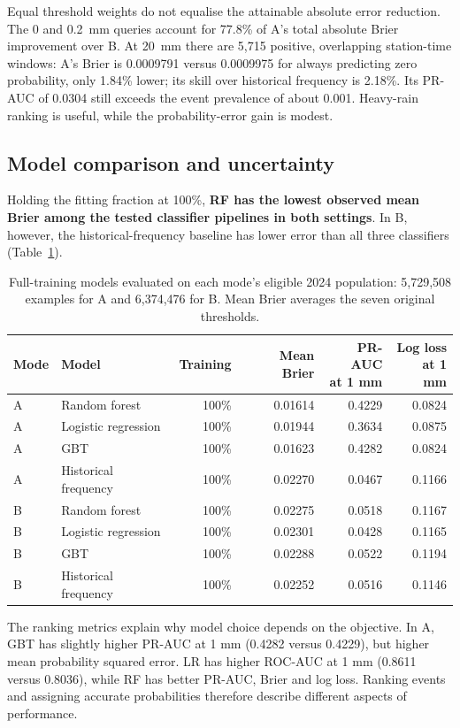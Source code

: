 \documentclass[11pt,a4paper]{article}
\begin{document}
Equal threshold weights do not equalise the attainable absolute error reduction. The 0 and 0.2~mm queries account for 77.8\% of A's total absolute Brier improvement over B. At 20~mm there are 5,715 positive, overlapping station-time windows: A's Brier is 0.0009791 versus 0.0009975 for always predicting zero probability, only 1.84\% lower; its skill over historical frequency is 2.18\%. Its PR-AUC of 0.0304 still exceeds the event prevalence of about 0.001. Heavy-rain ranking is useful, while the probability-error gain is modest.

\FloatBarrier
\subsection{Model comparison and uncertainty}
Holding the fitting fraction at 100\%, \textbf{RF has the lowest observed mean Brier among the tested classifier pipelines in both settings}. In B, however, the historical-frequency baseline has lower error than all three classifiers (Table~\ref{tab:t2baseline}).
\par
\begin{table}[!ht]\centering\small
\begin{tabular}{llrrrr}\toprule
Mode & Model & Training & Mean Brier & \shortstack{PR-AUC\\at 1 mm} & \shortstack{Log loss\\at 1 mm}\\\midrule
A & Random forest & 100\% & 0.01614 & 0.4229 & 0.0824 \\
A & Logistic regression & 100\% & 0.01944 & 0.3634 & 0.0875 \\
A & GBT & 100\% & 0.01623 & 0.4282 & 0.0824 \\
A & Historical frequency & 100\% & 0.02270 & 0.0467 & 0.1166 \\
B & Random forest & 100\% & 0.02275 & 0.0518 & 0.1167 \\
B & Logistic regression & 100\% & 0.02301 & 0.0428 & 0.1165 \\
B & GBT & 100\% & 0.02288 & 0.0522 & 0.1194 \\
B & Historical frequency & 100\% & 0.02252 & 0.0516 & 0.1146 \\
\bottomrule
\end{tabular}
\caption{Full-training models evaluated on each mode's eligible 2024 population: 5,729,508 examples for A and 6,374,476 for B. Mean Brier averages the seven original thresholds.}\label{tab:t2baseline}
\end{table}
\par
The ranking metrics explain why model choice depends on the objective. In A, GBT has slightly higher PR-AUC at 1 mm (0.4282 versus 0.4229), but higher mean probability squared error. LR has higher ROC-AUC at 1 mm (0.8611 versus 0.8036), while RF has better PR-AUC, Brier and log loss. Ranking events and assigning accurate probabilities therefore describe different aspects of performance.
\end{document}
